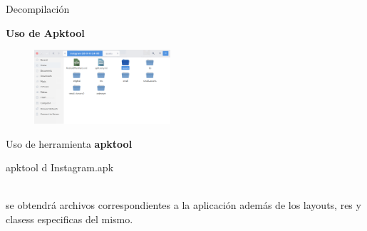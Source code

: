 
\begin{frame}[t,plain]
\titlepage
\end{frame}




\begin{frame}[t]{Decompilación}

\textbf{Uso de Apktool}

\begin{figure} 
\vspace{2pt}
  \begin{center}
    \includegraphics[width=0.45\textwidth]{apktool.png}
    \label{fig:databaseUserTable}
  \end{center}
  \vspace{2pt}
\end{figure} 

\bigskip

Uso de herramienta \textbf{apktool} 
\begin{center}
    apktool d Instagram.apk
\end{center}
 \\
 
 se obtendrá archivos correspondientes a la aplicación además de los layouts, res y clasess especificas del mismo.

\end{frame}

